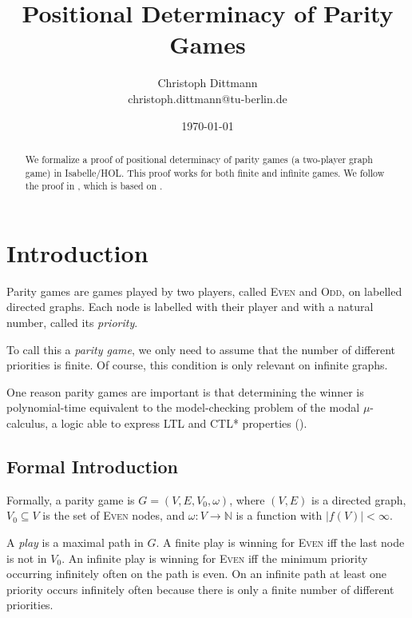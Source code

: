 \documentclass[11pt,a4paper]{scrartcl}
\newcommand{\Even}{\textsc{Even}\xspace}
\newcommand{\Odd}{\textsc{Odd}\xspace}
\begin{document}
\title{Positional Determinacy of Parity Games}
\author{Christoph Dittmann\\christoph.dittmann@tu-berlin.de}
\date{\today}
\maketitle

\begin{abstract}
  We formalize a proof of positional determinacy of parity games (a
  two-player graph game) in Isabelle/HOL.  This proof works for both
  finite and infinite games.  We follow the proof in
  \cite{kreutzer2015}, which is based on \cite{zielonka1998}.
\end{abstract}

\tableofcontents
\newpage

\section{Introduction}

Parity games are games played by two players, called \Even and \Odd,
on labelled directed graphs.  Each node is labelled with their player
and with a natural number, called its \emph{priority}.

To call this a \emph{parity game}, we only need to assume that the
number of different priorities is finite.  Of course, this condition
is only relevant on infinite graphs.

One reason parity games are important is that determining the winner
is polynomial-time equivalent to the model-checking problem of the
modal $\mu$-calculus, a logic able to express LTL and CTL* properties
(\cite{bradfield2007}).

\subsection{Formal Introduction}

Formally, a parity game is $G = (V,E,V_0,\omega)$, where $(V,E)$ is a
directed graph, $V_0 \subseteq V$ is the set of \Even nodes, and
$\omega: V \to \mathbb{N}$ is a function with $|f(V)| < \infty$.

A \emph{play} is a maximal path in $G$.  A finite play is winning for
\Even iff the last node is not in $V_0$.  An infinite play is winning
for \Even iff the minimum priority occurring infinitely often on the
path is even.  On an infinite path at least one priority occurs
infinitely often because there is only a finite number of different
priorities.
\end{document}
